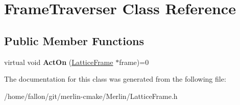 \hypertarget{classFrameTraverser}{}\section{Frame\+Traverser Class Reference}
\label{classFrameTraverser}
\subsection*{Public Member Functions}
\begin{DoxyCompactItemize}
\item 
\mbox{\label{classFrameTraverser_a4adeec2d73231f96b9611851194ea7df}} 
virtual void {\bfseries Act\+On} (\hyperlink{classLatticeFrame}{Lattice\+Frame} $\ast$frame)=0
\end{DoxyCompactItemize}


The documentation for this class was generated from the following file\+:\begin{DoxyCompactItemize}
\item 
/home/fallon/git/merlin-\/cmake/\+Merlin/Lattice\+Frame.\+h\end{DoxyCompactItemize}
